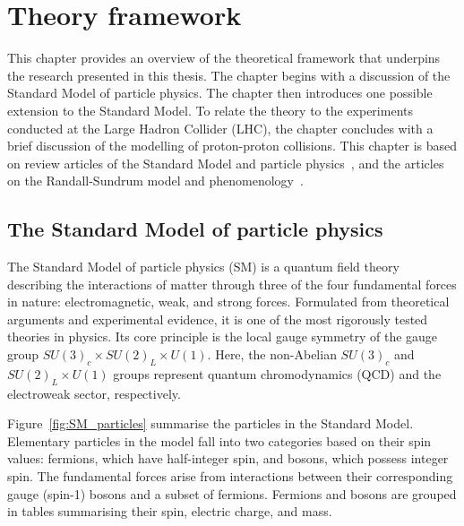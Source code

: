 


\chapter{Theory framework}

\graphicspath{{1_MainChapters/Chap2_Theory/Figs}}

This chapter provides an overview of the theoretical framework that underpins the research presented in this thesis.
The chapter begins with a discussion of the Standard Model of particle physics.
The chapter then introduces one possible extension to the Standard Model. To relate the theory to the experiments 
conducted at the Large Hadron Collider (LHC), the chapter concludes with a brief discussion of the modelling of proton-proton
collisions. This chapter is based on review articles of the Standard Model and particle physics~\cite{RevModPhys.71.S96,ParticleDataGroup:2022pth},
and the articles on the Randall-Sundrum model and phenomenology~\cite{Graviton_theory,Fitzpatrick:2007qr,Davoudiasl_2001}.

\section{The Standard Model of particle physics}
    The Standard Model of particle physics (SM) is a quantum field theory 
    describing the interactions of matter through three of the four 
    fundamental forces in nature: electromagnetic, weak, and strong 
    forces. Formulated from theoretical arguments and experimental 
    evidence, it is one of the most rigorously tested theories in physics. 
    Its core principle is the local gauge symmetry of the gauge group 
    $SU(3)_c \times SU(2)_L \times U(1)$. Here, the non-Abelian 
    $SU(3)_c$ and $SU(2)_L \times U(1)$ groups represent quantum chromodynamics (QCD) 
    and the electroweak sector, respectively.

    Figure~\ref{fig:SM_particles} summarise the particles
    in the Standard Model. Elementary particles in the model fall into two categories based on 
    their spin values: fermions, which have half-integer spin, and bosons, 
    which possess integer spin. The fundamental forces arise from interactions 
    between their corresponding gauge (spin-1) bosons and a subset of fermions. 
    Fermions and bosons are grouped in tables summarising their spin, 
    electric charge, and mass.

